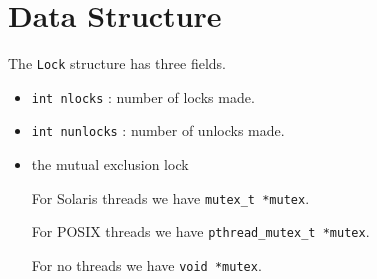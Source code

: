 \par
\section{Data Structure}
\label{section:Lock:dataStructure}
\par
The {\tt Lock} structure has three fields.
\begin{itemize}
\item {\tt int nlocks} : number of locks made.
\item {\tt int nunlocks} : number of unlocks made.
\item the mutual exclusion lock
\par
For Solaris threads we have {\tt mutex\_t *mutex}.
\par
For POSIX threads we have {\tt pthread\_mutex\_t *mutex}.
\par
For no threads we have {\tt void *mutex}.
\end{itemize}

